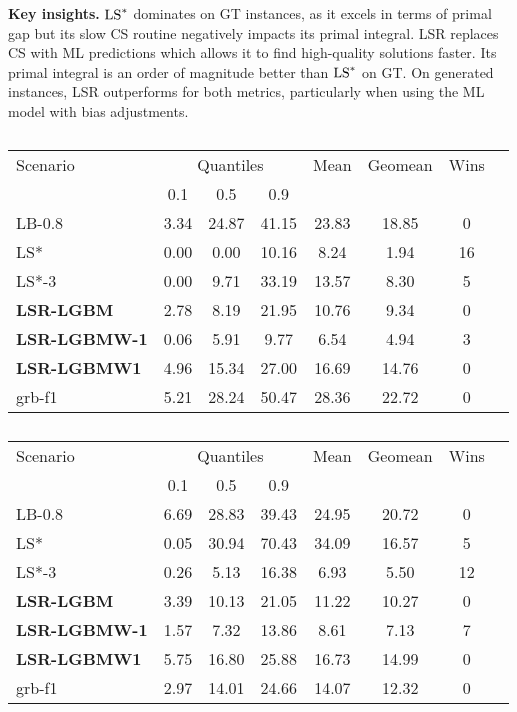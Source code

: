 \documentclass[3p, authoryear, times, doubleblind]{elsarticle}
\begin{document}
{\textbf{Key insights.} $\text{LS}^*$ dominates on GT instances, as it excels in terms of primal gap but its slow CS routine negatively impacts its primal integral. LSR replaces CS with ML predictions which allows it to find high-quality solutions faster. Its primal integral is an order of magnitude better than $\text{LS}^*$ on GT. On generated instances, LSR outperforms for both metrics, particularly when using the ML model with bias adjustments. 

\begin{table}[h]
\centering
\caption{}
\label{tab:primal_gap_ml_GT_2-hour}
\begin{tabular}{lccccccc}
\toprule
{Scenario} & \multicolumn{3}{c}{Quantiles} & {Mean} & {Geomean} & {Wins} \\
{} & {0.1} & {0.5} & {0.9} & {} & {} & {} \\
\midrule
LB-0.8 & 3.34 & 24.87 & 41.15 & 23.83 & 18.85 & 0 \\
LS* & 0.00 & 0.00 & 10.16 & 8.24 & 1.94 & 16 \\
LS*-3 & 0.00 & 9.71 & 33.19 & 13.57 & 8.30 & 5 \\
\textbf{LSR-LGBM} & 2.78 & 8.19 & 21.95 & 10.76 & 9.34 & 0 \\
\textbf{LSR-LGBMW-1} & 0.06 & 5.91 & 9.77 & 6.54 & 4.94 & 3 \\
\textbf{LSR-LGBMW1} & 4.96 & 15.34 & 27.00 & 16.69 & 14.76 & 0 \\
grb-f1 & 5.21 & 28.24 & 50.47 & 28.36 & 22.72 & 0 \\
\bottomrule
\end{tabular}
\end{table}


\begin{table}[h]
\centering
\caption{}
\label{tab:primal_integral_ml_GT_2-hour}
\begin{tabular}{lccccccc}
\toprule
{Scenario} & \multicolumn{3}{c}{Quantiles} & {Mean} & {Geomean} & {Wins} \\
{} & {0.1} & {0.5} & {0.9} & {} & {} & {} \\
\midrule
LB-0.8 & 6.69 & 28.83 & 39.43 & 24.95 & 20.72 & 0 \\
LS* & 0.05 & 30.94 & 70.43 & 34.09 & 16.57 & 5 \\
LS*-3 & 0.26 & 5.13 & 16.38 & 6.93 & 5.50 & 12 \\
\textbf{LSR-LGBM} & 3.39 & 10.13 & 21.05 & 11.22 & 10.27 & 0 \\
\textbf{LSR-LGBMW-1} & 1.57 & 7.32 & 13.86 & 8.61 & 7.13 & 7 \\
\textbf{LSR-LGBMW1} & 5.75 & 16.80 & 25.88 & 16.73 & 14.99 & 0 \\
grb-f1 & 2.97 & 14.01 & 24.66 & 14.07 & 12.32 & 0 \\
\bottomrule
\end{tabular}
\end{table}


}
\end{document}

